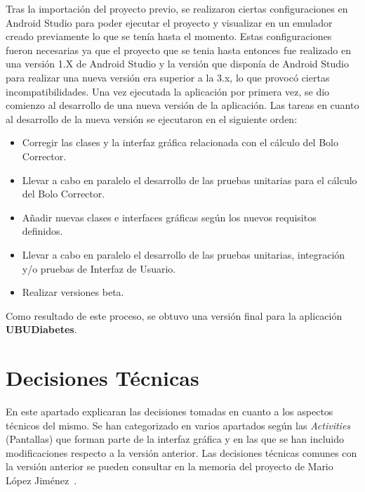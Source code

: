 Tras la importación del proyecto previo, se realizaron ciertas configuraciones en Android Studio para poder ejecutar el proyecto y visualizar en un emulador creado previamente lo que se tenía hasta el momento. Estas configuraciones fueron necesarias ya que el proyecto que se tenia hasta entonces fue realizado en una versión 1.X de Android Studio y la versión que disponía de Android Studio para realizar una nueva versión era superior a la 3.x, lo que provocó ciertas incompatibilidades.
Una vez ejecutada la aplicación por primera vez, se dio comienzo al desarrollo de una nueva versión de la aplicación. Las tareas en cuanto al desarrollo de la nueva versión se ejecutaron en el siguiente orden:
\begin{itemize}
	\item Corregir las clases y la interfaz gráfica relacionada con el cálculo del Bolo Corrector.
	\item Llevar a cabo en paralelo el desarrollo de las pruebas unitarias para el cálculo del Bolo Corrector.
	\item Añadir nuevas clases e interfaces gráficas según los nuevos requisitos definidos.
	\item Llevar a cabo en paralelo el desarrollo de las pruebas unitarias, integración y/o pruebas de Interfaz de Usuario.
	\item Realizar versiones beta.
\end{itemize}
Como resultado de este proceso, se obtuvo una versión final para la aplicación \textbf{UBUDiabetes}.

\section{Decisiones Técnicas}
En este apartado explicaran las decisiones tomadas en cuanto a los aspectos técnicos del mismo.
Se han categorizado en varios apartados según las \textit{Activities} (Pantallas) que forman parte de la interfaz gráfica y en las que se han incluido modificaciones respecto a la versión anterior.
Las decisiones técnicas comunes con la versión anterior se pueden consultar en la memoria del proyecto de Mario López Jiménez~\cite{mario2016}.
